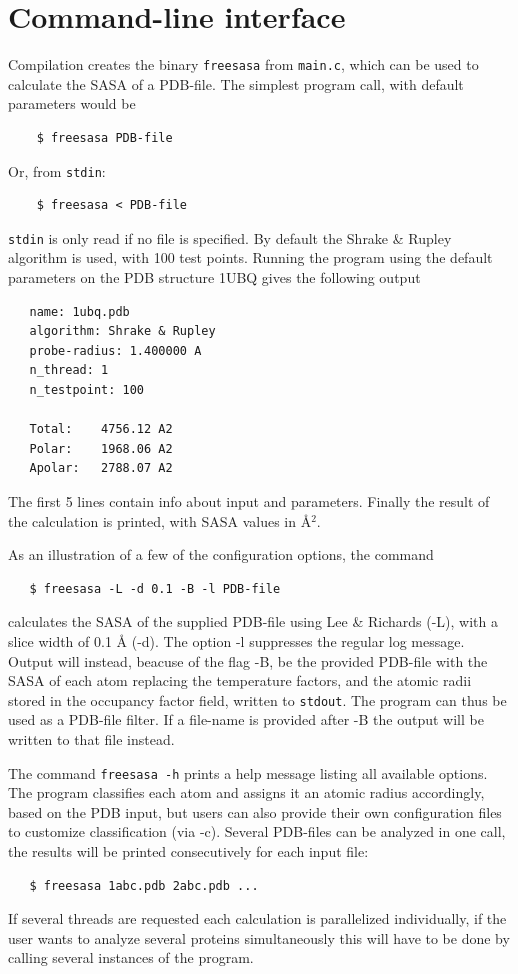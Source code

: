 \documentclass[a4paper,11pt]{article}
\begin{document}
\section{Command-line interface}

Compilation creates the binary \verb|freesasa| from
\verb|main.c|, which can be used to calculate the SASA of a
PDB-file. The simplest program call, with default parameters would be
\begin{verbatim}
    $ freesasa PDB-file
\end{verbatim}
Or, from \verb|stdin|:
\begin{verbatim} 
    $ freesasa < PDB-file    
\end{verbatim}
\verb|stdin| is only read if no file is specified.  By default the
Shrake \& Rupley algorithm is used, with 100 test points. Running the
program using the default parameters on the PDB structure 1UBQ gives
the following output
\begin{verbatim}
   name: 1ubq.pdb
   algorithm: Shrake & Rupley
   probe-radius: 1.400000 A
   n_thread: 1
   n_testpoint: 100
   
   Total:    4756.12 A2
   Polar:    1968.06 A2
   Apolar:   2788.07 A2
\end{verbatim}
The first 5 lines contain info about input and parameters. Finally the
result of the calculation is printed, with SASA values in Å$^2$.

As an illustration of a few of the configuration options, the command
\begin{verbatim}
   $ freesasa -L -d 0.1 -B -l PDB-file
\end{verbatim}
calculates the SASA of the supplied PDB-file using Lee \& Richards
(-L), with a slice width of 0.1 Å (-d). The option -l suppresses the
regular log message. Output will instead, beacuse of the flag -B, be
the provided PDB-file with the SASA of each atom replacing the
temperature factors, and the atomic radii stored in the occupancy
factor field, written to \verb|stdout|. The program can thus be used
as a PDB-file filter. If a file-name is provided after -B the
output will be written to that file instead.

The command \verb|freesasa -h| prints a help message listing all
available options. The program classifies each atom and assigns it an
atomic radius accordingly, based on the PDB input, but users can also
provide their own configuration files to customize classification (via
-c).  Several PDB-files can be analyzed in one call, the results will
be printed consecutively for each input file:
\begin{verbatim}
   $ freesasa 1abc.pdb 2abc.pdb ...
\end{verbatim}
If several threads are requested each calculation is parallelized
individually, if the user wants to analyze several proteins
simultaneously this will have to be done by calling several instances
of the program.
\end{document}
